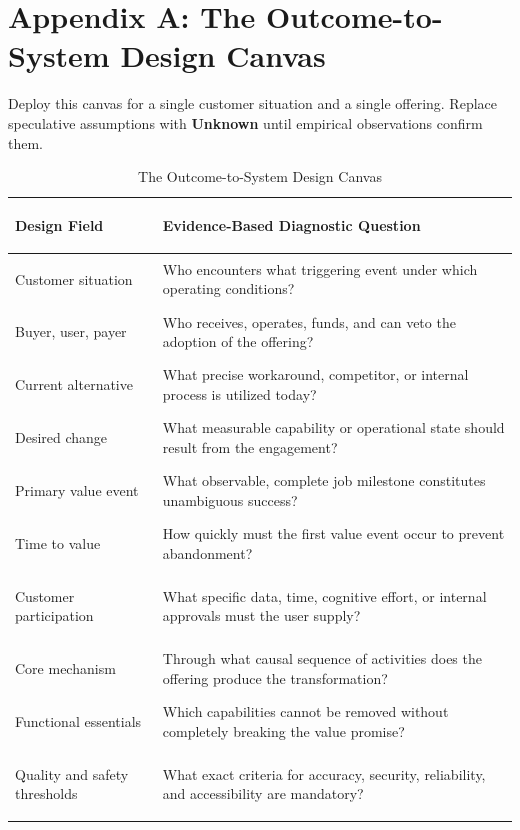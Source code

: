 
\section*{Appendix A: The Outcome-to-System Design Canvas}

Deploy this canvas for a single customer situation and a single offering. Replace speculative assumptions with \textbf{Unknown} until empirical observations confirm them.

\begin{table}[t]
\centering
\small
\caption{The Outcome-to-System Design Canvas}
\label{tab:outcome_system_canvas}
\begin{tabularx}{\textwidth}{>{\bfseries\raggedright\arraybackslash}p{} >{\raggedright\arraybackslash}X}
\toprule
Design Field & Evidence-Based Diagnostic Question \\
\midrule
Customer situation & Who encounters what triggering event under which operating conditions? \\
Buyer, user, payer & Who receives, operates, funds, and can veto the adoption of the offering? \\
Current alternative & What precise workaround, competitor, or internal process is utilized today? \\
Desired change & What measurable capability or operational state should result from the engagement? \\
Primary value event & What observable, complete job milestone constitutes unambiguous success? \\
Time to value & How quickly must the first value event occur to prevent abandonment? \\
Customer participation & What specific data, time, cognitive effort, or internal approvals must the user supply? \\
Core mechanism & Through what causal sequence of activities does the offering produce the transformation? \\
Functional essentials & Which capabilities cannot be removed without completely breaking the value promise? \\
Quality and safety thresholds & What exact criteria for accuracy, security, reliability, and accessibility are mandatory? \\

\end{tabularx}
\end{table}
